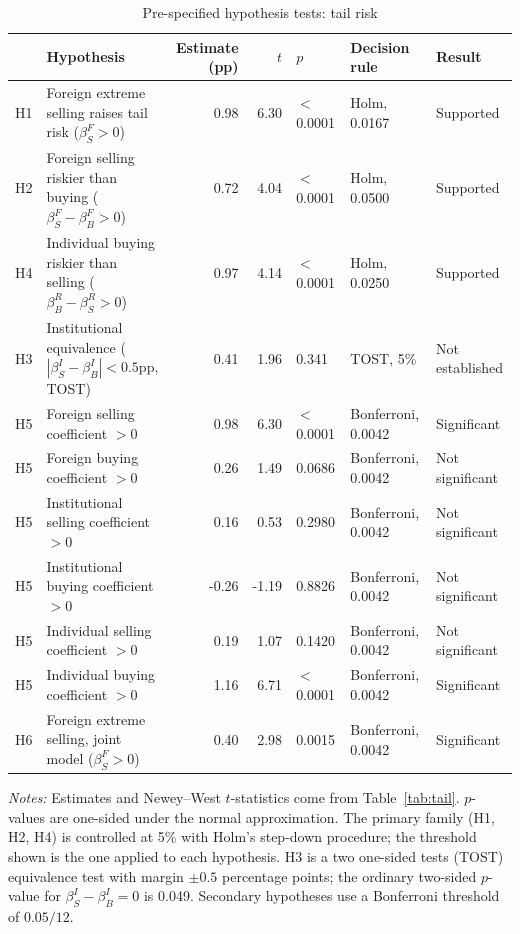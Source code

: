 \begin{table}[htbp]\centering
\caption{Pre-specified hypothesis tests: tail risk}\label{tab:hyp}
\scriptsize\setlength{\tabcolsep}{3pt}
\begin{tabular}{llrrlll}\toprule
 & Hypothesis & Estimate (pp) & $t$ & $p$ & Decision rule & Result \\\midrule
H1 & Foreign extreme selling raises tail risk ($\beta^F_S>0$) & 0.98 & 6.30 & $<$0.0001 & Holm, 0.0167 & Supported \\
H2 & Foreign selling riskier than buying ($\beta^F_S-\beta^F_B>0$) & 0.72 & 4.04 & $<$0.0001 & Holm, 0.0500 & Supported \\
H4 & Individual buying riskier than selling ($\beta^R_B-\beta^R_S>0$) & 0.97 & 4.14 & $<$0.0001 & Holm, 0.0250 & Supported \\
H3 & Institutional equivalence ($|\beta^I_S-\beta^I_B|<0.5$pp, TOST) & 0.41 & 1.96 & 0.341 & TOST, 5\% & Not established \\
\midrule
H5 & Foreign selling coefficient $>0$ & 0.98 & 6.30 & $<$0.0001 & Bonferroni, 0.0042 & Significant \\
H5 & Foreign buying coefficient $>0$ & 0.26 & 1.49 & 0.0686 & Bonferroni, 0.0042 & Not significant \\
H5 & Institutional selling coefficient $>0$ & 0.16 & 0.53 & 0.2980 & Bonferroni, 0.0042 & Not significant \\
H5 & Institutional buying coefficient $>0$ & -0.26 & -1.19 & 0.8826 & Bonferroni, 0.0042 & Not significant \\
H5 & Individual selling coefficient $>0$ & 0.19 & 1.07 & 0.1420 & Bonferroni, 0.0042 & Not significant \\
H5 & Individual buying coefficient $>0$ & 1.16 & 6.71 & $<$0.0001 & Bonferroni, 0.0042 & Significant \\
H6 & Foreign extreme selling, joint model ($\beta^F_S>0$) & 0.40 & 2.98 & 0.0015 & Bonferroni, 0.0042 & Significant \\
\bottomrule\end{tabular}
\begin{minipage}{0.95\textwidth}\vspace{0.5em}\scriptsize
\textit{Notes:} Estimates and Newey--West $t$-statistics come from Table~\ref{tab:tail}. $p$-values are one-sided under the normal approximation. The primary family (H1, H2, H4) is controlled at 5\% with Holm's step-down procedure; the threshold shown is the one applied to each hypothesis. H3 is a two one-sided tests (TOST) equivalence test with margin $\pm0.5$ percentage points; the ordinary two-sided $p$-value for $\beta^I_S-\beta^I_B=0$ is 0.049. Secondary hypotheses use a Bonferroni threshold of $0.05/12$.
\end{minipage}\end{table}